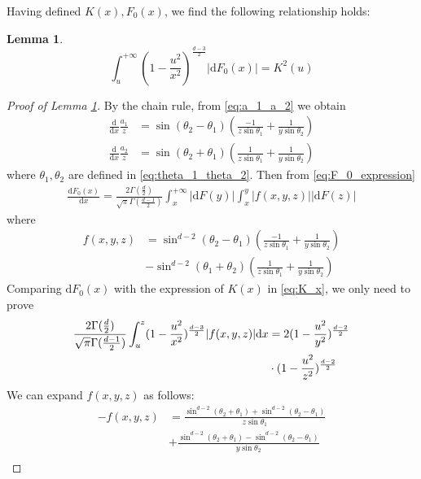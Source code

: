 \documentclass[conference,a4paper]{IEEEtran}
\def\d{\mathrm{d}}
\newtheorem{lemma}{Lemma}
\begin{document}
Having defined $K(x), F_0(x)$, we find the following relationship holds:
\begin{lemma}\label{lem:K_F_relationship}
\begin{equation}\label{eq:F_0_integration}
     \int_u^{+\infty}
     (1-\frac{u^2}{x^2})^{\frac{d-3}{2}} |\d F_0(x)| = K^2(u)
\end{equation}
\end{lemma}
\begin{proof}[Proof of Lemma \ref{lem:K_F_relationship}]
     By the chain rule, from \eqref{eq:a_1_a_2} we obtain
\begin{align*}
    \frac{\d}{\d x}\frac{a_1}{z} &
    = \sin(\theta_2 - \theta_1)
    \left(\frac{-1}{z\sin\theta_1}
    +\frac{1}{y\sin \theta_2}\right)\\
    \frac{\d}{\d x}\frac{a_2}{z} &
    = \sin(\theta_2 + \theta_1)
    \left(\frac{1}{z\sin\theta_1}
    +\frac{1}{y\sin \theta_2}\right)
\end{align*}
where $\theta_1, \theta_2$ are defined in \eqref{eq:theta_1_theta_2}.
Then from \eqref{eq:F_0_expression}
\begin{align*}
    \frac{\d F_0(x)}{\d x}  =\frac{2\Gamma(\frac{d}{2})}
    {\sqrt{\pi}\Gamma(\frac{d-1}{2})}
    \int_x^{+\infty} |\d F(y)| \int_x^y |f(x,y,z)| |\d F(z)| 
\end{align*}
where
\begin{align*}
    f(x,y,z) &= \sin^{d-2} (\theta_2 - \theta_1)
    \left(\frac{-1}{z\sin\theta_1}
    +\frac{1}{y\sin \theta_2}\right) \\
    &- \sin^{d-2}(\theta_1 + \theta_2)
    \left(\frac{1}{z\sin\theta_1}
    +\frac{1}{y\sin \theta_2}\right)
\end{align*}
Comparing $\d F_0(x)$
with the expression of $K(x)$ in
\eqref{eq:K_x},
we only need to prove
\begin{align}
    \frac{2\Gamma(\frac{d}{2})}
    {\sqrt{\pi}\Gamma(\frac{d-1}{2})}
    \int_u^z (1-\frac{u^2}{x^2})^{\frac{d-3}{2}}
    |f(x,y,z)|\d x &=
    2(1-\frac{u^2}{y^2})^{\frac{d-2}{2}} \notag\\
    &\cdot (1-\frac{u^2}{z^2})^{\frac{d-2}{2}}
    \label{eq:ref_prove_integration}    
\end{align}
We can expand $f(x,y,z)$ as follows:
\begin{align*}
-f(x,y,z)&=\frac{\sin^{d-2}(\theta_2+\theta_1)
+ \sin^{d-2}(\theta_2 - \theta_1)}{z\sin\theta_1}\\
&+\frac{\sin^{d-2}(\theta_2+\theta_1)
- \sin^{d-2}(\theta_2 - \theta_1)}{y\sin\theta_2} \\

\end{align*}
\end{proof}
\end{document}
